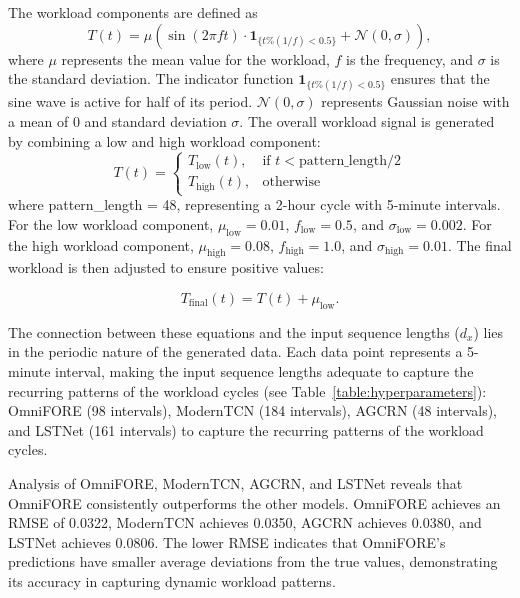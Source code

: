 The workload components are defined as 
\begin{equation}
T(t) = \mu \left( \sin(2\pi f t) \cdot \mathbf{1}_{\{t \% (1/f) < 0.5\}} + \mathcal{N}(0, \sigma) \right),
\end{equation}
where $\mu$ represents the mean value for the workload, $f$ is the frequency, and $\sigma$ is the standard deviation. The indicator function $\mathbf{1}_{\{t \% (1/f) < 0.5\}}$ ensures that the sine wave is active for half of its period. $\mathcal{N}(0, \sigma)$ represents Gaussian noise with a mean of 0 and standard deviation $\sigma$. The overall workload signal is generated by combining a low and high workload component:
\begin{equation}
T(t) = \begin{cases} 
T_{\text{low}}(t), & \text{if } t < \text{pattern\_length} / 2 \\
T_{\text{high}}(t), & \text{otherwise}
\end{cases}
\end{equation}
where pattern\_length = 48, representing a 2-hour cycle with 5-minute intervals.
For the low workload component, $\mu_{\text{low}} = 0.01$, $f_{\text{low}} = 0.5$, and $\sigma_{\text{low}} = 0.002$. For the high workload component, $\mu_{\text{high}} = 0.08$, $f_{\text{high}} = 1.0$, and $\sigma_{\text{high}} = 0.01$. The final workload is then adjusted to ensure positive values:

\begin{equation}
T_{\text{final}}(t) = T(t) + \mu_{\text{low}}.
\end{equation}

The connection between these equations and the input sequence lengths ($d_x$) lies in the periodic nature of the generated data. Each data point represents a 5-minute interval, making the input sequence lengths adequate to capture the recurring patterns of the workload cycles (see Table~\ref{table:hyperparameters}): \ac{OmniFORE} (98 intervals), \ac{ModernTCN} (184 intervals), \ac{AGCRN} (48 intervals), and \ac{LSTNet} (161 intervals) to capture the recurring patterns of the workload cycles.

Analysis of \ac{OmniFORE}, \ac{ModernTCN}, \ac{AGCRN}, and \ac{LSTNet} reveals that \ac{OmniFORE} consistently outperforms the other models. \ac{OmniFORE} achieves an \ac{RMSE} of 0.0322, \ac{ModernTCN} achieves 0.0350, \ac{AGCRN} achieves 0.0380, and \ac{LSTNet} achieves 0.0806. The lower \ac{RMSE} indicates that \ac{OmniFORE}'s predictions have smaller average deviations from the true values, demonstrating its accuracy in capturing dynamic workload patterns.

